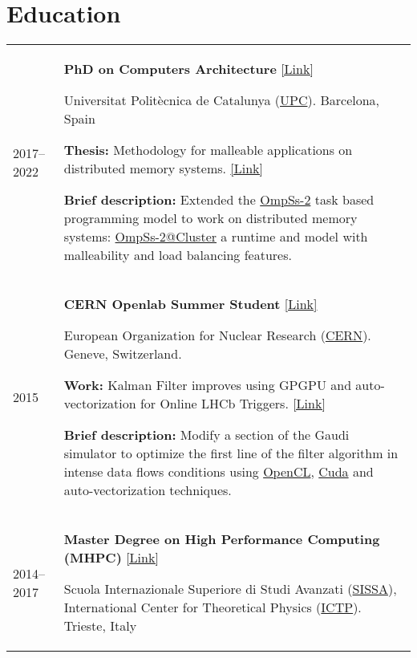 \documentclass[a4paper,11pt]{article}
\begin{document}
\section{Education}
\begin{tabularx}{\linewidth}{@{}l X@{}}
  2017--2022 & \textbf{PhD on Computers Architecture}
               \href{https://www.ac.upc.edu/en/academics/ph-d/ph-d-programme-by-computer-architecture}{[Link]}

               Universitat Polit\`ecnica de Catalunya (\href{https://www.upc.edu/en}{UPC}).
               Barcelona, Spain

               \textbf{Thesis:} Methodology for malleable applications on distributed memory systems.
               \href{http://paul-carpenter.org/aguilar2022thesis.pdf}{[Link]}

               \textbf{Brief description:} Extended the \href{https://pm.bsc.es/ompss-2}{OmpSs-2} task based programming model to
               work on distributed memory systems: \href{https://github.com/bsc-pm/ompss-2-cluster-releases}{OmpSs-2@Cluster}
               a runtime and model with malleability and load balancing features.
  \\

  2015 & \textbf{CERN Openlab Summer Student} \href{https://home.cern/science/computing/cern-openlab}{[Link]}

         European Organization for Nuclear Research (\href{https://home.cern/}{CERN}).
         Geneve, Switzerland.

         \textbf{Work:} Kalman Filter improves using GPGPU and auto-vectorization for Online LHCb Triggers.
         \href{https://zenodo.org/record/31869}{[Link]}

         \textbf{Brief description:} Modify a section of the Gaudi simulator to optimize the first line
         of the filter algorithm in intense data flows conditions using \href{https://www.khronos.org/opencl/}{OpenCL},
         \href{https://developer.nvidia.com/cuda-zone}{Cuda} and auto-vectorization techniques.
  \\

  2014--2017 & \textbf{Master Degree on High Performance Computing (MHPC)} \href{http://www.mhpc.it}{[Link]}

               Scuola Internazionale Superiore di Studi Avanzati (\href{https://www.sissa.it/}{SISSA}),
               International Center for Theoretical Physics (\href{https://www.ictp.it/}{ICTP}).
               Trieste, Italy


\end{tabularx}
\end{document}
